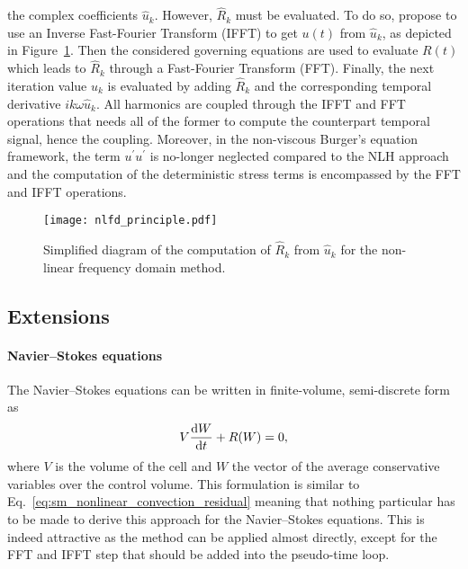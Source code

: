 the complex coefficients $\widehat{u}_k$. 
However, $\widehat{R}_k$ must be evaluated. To do so, \citet{McMullen2001}
propose to use an Inverse Fast-Fourier Transform (IFFT) to get
$u(t)$ from $\widehat{u}_k$, as depicted
in Figure~\ref{fig:nlfd_principle}. Then the considered governing equations
are used to evaluate $R(t)$ which leads to $\widehat{R}_k$
through a Fast-Fourier Transform (FFT). Finally, the next iteration value 
$\widehat{u}_k$
is evaluated by adding $\widehat{R}_k$ and 
the corresponding temporal derivative $i k \omega \widehat{u}_k$. All
harmonics are coupled through the IFFT and FFT operations
that needs all of the former to compute the counterpart temporal signal,
hence the coupling. Moreover, 
in the non-viscous Burger's equation framework, 
the term $u^\prime u^\prime$ is no-longer neglected compared to the
NLH approach and the computation of the deterministic stress terms is encompassed
by the FFT and IFFT operations.
\begin{figure}[htp]
  \centering
  \texttt{[image: nlfd\_principle.pdf]}
  \caption{Simplified diagram of the computation of $\widehat{R}_k$ from $\widehat{u}_k$
  for the non-linear frequency domain method.}
  \label{fig:nlfd_principle}
\end{figure}

\subsection{Extensions}

\paragraph{Navier--Stokes equations}
The Navier--Stokes equations can be written in finite-volume,
semi-discrete form as
\begin{equation}
	V \frac{\diff W}{\diff t} + R(W) = 0,
	\label{eq:navier_stokes_fv_sd}
\end{equation}
where $V$ is the volume of the cell and $W$
the vector of the average conservative variables over the
control volume.
This formulation is similar to
Eq.~\eqref{eq:sm_nonlinear_convection_residual} meaning that
nothing particular has to be made to derive this approach for
the Navier--Stokes equations. This is indeed attractive as the
method can be applied almost directly, except for the FFT and IFFT
step that should be added into the pseudo-time loop.

